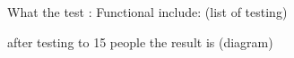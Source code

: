\documentclass[conference, letterpaper]{IEEEtran}
\begin{document}
What the test :
Functional include: (list of testing)

after testing to 15 people the result is
(diagram)


%
%



%
%
\end{document}
